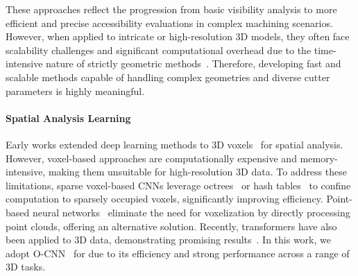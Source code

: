 These approaches reflect the progression from basic visibility analysis to more efficient and precise accessibility evaluations in complex machining scenarios. However, when applied to intricate or high-resolution 3D models, they often face scalability challenges and significant computational overhead due to the time-intensive nature of strictly geometric methods~\cite{dai2018support}. Therefore, developing fast and scalable methods capable of handling complex geometries and diverse cutter parameters is highly meaningful.


\paragraph{Spatial Analysis Learning}

Early works extended deep learning methods to 3D voxels~\cite{Maturana2015,Wu2015} for spatial analysis.
However, voxel-based approaches are computationally expensive and memory-intensive, making them unsuitable for high-resolution 3D data.
To address these limitations, sparse voxel-based CNNs leverage octrees~\cite{Wang2017} or hash tables~\cite{Graham2018,Choy2019} to confine computation to sparsely occupied voxels, significantly improving efficiency.
Point-based neural networks~\cite{Qi2017a,Qi2017,Li2018} eliminate the need for voxelization by directly processing point clouds, offering an alternative solution.
Recently, transformers have also been applied to 3D data, demonstrating promising results~\cite{Guo2021,Zhao2021,Wang2023}.
In this work, we adopt O-CNN~\cite{Wang2017} for \accessAna due to its efficiency and strong performance across a range of 3D tasks.




